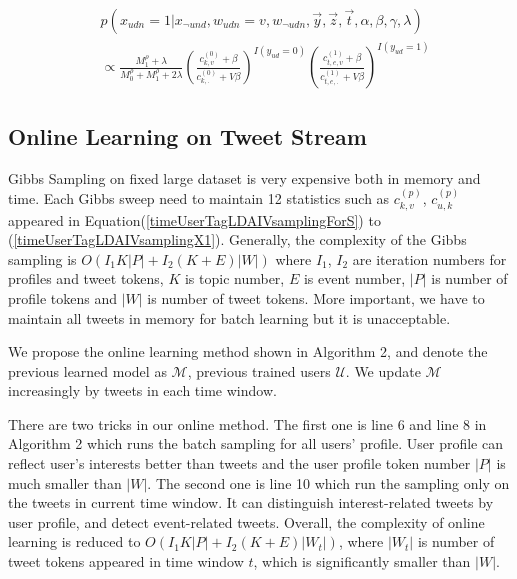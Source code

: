 \documentclass[runningheads,a4paper]{llncs}
\begin{document}
\begin{scriptsize}
\begin{equation}
\label{timeUserTagLDAIVsamplingX1}
\begin{aligned}
&p(x_{udn}=1|x_{\neg{und}},w_{udn}=v,w_{\neg{udn}},\vec{y},\vec{z},\vec{t},\alpha,\beta,\gamma,\lambda)\\
&\propto \frac{M^{\rho}_1+\lambda}{M^{\rho}_0+M^{\rho}_1+2\lambda} (\frac{c_{k,v}^{(0)}+\beta}{c_{k,.}^{(0)}+V\beta})^{I(y_{ud}=0)}(\frac{c_{t,e,v}^{(1)}+\beta}{c_{t,e,.}^{(1)}+V\beta})^{I(y_{ud}=1)}
\end{aligned}
\end{equation}
\end{scriptsize}



\subsection{Online Learning on Tweet Stream}\label{subsec:online}
Gibbs Sampling on fixed large dataset is very expensive both in memory and time.
Each Gibbs sweep need to maintain 12 statistics such as \(c^{(p)}_{k,v}\), \(c^{(p)}_{u,k}\) appeared in Equation(\ref{timeUserTagLDAIVsamplingForS}) to (\ref{timeUserTagLDAIVsamplingX1}).
Generally, the complexity of the Gibbs sampling is \(O(I_1 K|P|+I_2 (K+E)|W|)\) where \(I_1\), \(I_2\) are iteration numbers for profiles and tweet tokens, \(K\) is topic number, \(E\) is event number, \(|P|\) is number of profile tokens and \(|W|\) is number of tweet tokens.
More important, we have to maintain all tweets in memory for batch learning but it is unacceptable.

We propose the online learning method shown in Algorithm 2, and denote the previous learned model as \(\mathcal{M}\), previous trained users \(\mathcal{U}\).
We update \(\mathcal{M}\) increasingly by tweets in each time window.

There are two tricks in our online method.
The first one is line 6 and line 8 in Algorithm 2 which runs the batch sampling for all users' profile.
User profile can reflect user's interests better than tweets and the user profile token number \(|P|\) is much smaller than \(|W|\).
The second one is line 10 which run the sampling only on the tweets in current time window.
It can distinguish interest-related tweets by user profile, and detect event-related tweets.
Overall, the complexity of online learning is reduced to \(O(I_1 K|P|+I_2 (K+E)|W_t|)\), where \(|W_t|\) is number of tweet tokens appeared in time window \(t\), which is significantly smaller than \(|W|\). 
\end{document}

